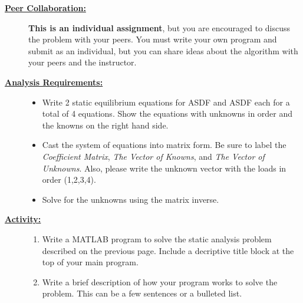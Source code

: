 \documentclass[11pt]{article}
\begin{document}
\begin{description}
  \item[\textbf{\underline{Peer Collaboration:}}] \hfill \vspace{0mm}
  
  {\bf This is an individual assignment}, but you are encouraged to discuss the problem with your peers. You must write your own program and submit as an individual, but you can share ideas about the algorithm with your peers and the instructor.

\newpage  
\item[\textbf{\underline{Analysis Requirements:}}] \hfill \vspace{0mm}

  
  \begin{itemize}
    
  \item Write 2 static equilibrium equations for ASDF and ASDF each for a total of 4 equations. Show the equations with unknowns in order and the knowns on the right hand side.\vspace{10mm} \\
  
  
  \item Cast the system of equations into matrix form. Be sure to label the {\it Coefficient Matrix}, {\it The Vector of Knowns}, and {\it The Vector of Unknowns}. Also, please write the unknown vector with the loads in order (1,2,3,4).\vspace{10mm}
  
  
  \item Solve for the unknowns using the matrix inverse. 
  
  \end{itemize}


\item[\textbf{\underline{Activity:}}] \hfill \vspace{0mm}

\begin{enumerate}
  

  \item Write a MATLAB program to solve the static analysis problem described on the previous page. Include a decriptive title block at the top of your main program. 
  
  
  \item Write a brief description of how your program works to solve the problem. This can be a few sentences or a bulleted list.
  

\end{enumerate}
\end{description}
\end{document}
